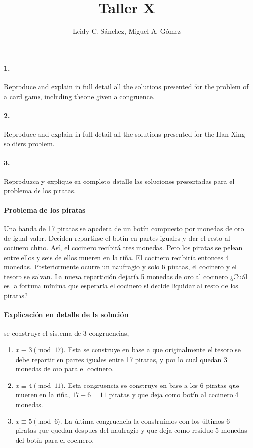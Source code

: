\documentclass{article}
\begin{document}
	\title{Taller X}
	\author{Leidy C. Sánchez, Miguel A. Gómez}
	\maketitle

\paragraph{1.} Reproduce and explain in full detail all the solutions presented for the problem of a card game, including theone given a congruence.

\paragraph{2.} Reproduce and explain in full detail all the solutions presented for the Han Xing soldiers problem.

\paragraph{3.}  Reproduzca y explique en completo detalle las soluciones presentadas para el problema de los piratas.

\paragraph{Problema de los piratas} Una banda de 17 piratas se apodera de un botín compuesto por monedas de oro de igual valor. Deciden repartirse el botín en partes iguales y dar el resto al cocinero chino. Así, el cocinero recibirá tres monedas. Pero los piratas se pelean entre ellos y seis de ellos mueren en la riña. El cocinero recibiría entonces 4 monedas. Posteriormente ocurre un naufragio y solo 6 piratas, el cocinero y el tesoro se salvan. La nueva repartición dejaría 5 monedas de oro al cocinero ¿Cuál es la fortuna mínima que esperaría el cocinero si decide liquidar al resto de los piratas?

\paragraph{Explicación en detalle de la solución} se construye el sistema de 3 congruencias,

\begin{enumerate}
    \item $x \equiv 3 \pmod{17}$. Esta se construye en base a que originalmente el tesoro se debe repartir en partes iguales entre 17 piratas, y por lo cual quedan 3 monedas de oro para el cocinero.
    \item $x \equiv 4 \pmod{11}$. Esta congruencia se construye en base a los 6 piratas que mueren en la riña, $17-6 = 11$ piratas y que deja como botín al cocinero 4 monedas.
    \item $x \equiv 5 \pmod{6}$. La última congruencia la construímos con los últimos 6 piratas que quedan despues del naufragio y que deja como residuo 5 monedas del botín para el cocinero.
\end{enumerate}
\end{document}
